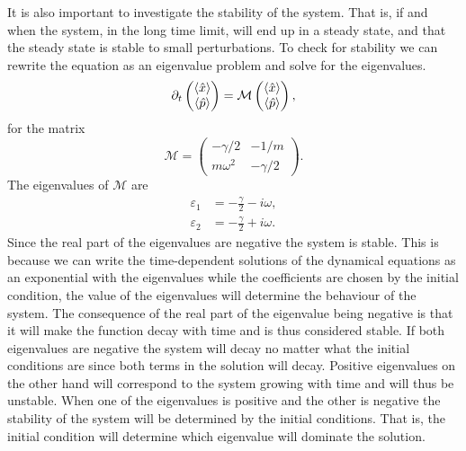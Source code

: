 It is also important to investigate the stability of the system. That is, if and when the system, in the long time limit, will end up in a steady state, and that the steady state is stable to small perturbations. To check for stability we can rewrite the equation as an eigenvalue problem and solve for the eigenvalues.
\begin{equation}
    \partial_t 
    \begin{pmatrix}
        \expval{\hat{x}}\\
        \expval{\hat{p}}    
    \end{pmatrix}
    = \mathcal{M}
    \begin{pmatrix}
        \expval{\hat{x}}\\
        \expval{\hat{p}} 
    \end{pmatrix},
\end{equation}
for the matrix
\begin{equation}
    \mathcal{M} = \begin{pmatrix}
        -\gamma/2 & -1/m \\
        m\omega^2 & -\gamma/2
    \end{pmatrix}.
\end{equation}
The eigenvalues of $\mathcal{M}$ are 
\begin{align}
    \varepsilon_1 &= -\frac{\gamma}{2} - i\omega,\\
    \varepsilon_2 &= -\frac{\gamma}{2} + i\omega.
\end{align}
Since the real part of the eigenvalues are negative the system is stable. This is because we can write the time-dependent solutions of the dynamical equations as an exponential with the eigenvalues while the coefficients are chosen by the initial condition, the value of the eigenvalues will determine the behaviour of the system. The consequence of the real part of the eigenvalue being negative is that it will make the function decay with time and is thus considered stable. If both eigenvalues are negative the system will decay no matter what the initial conditions are since both terms in the solution will decay. Positive eigenvalues on the other hand will correspond to the system growing with time and will thus be unstable. When one of the eigenvalues is positive and the other is negative the stability of the system will be determined by the initial conditions. That is, the initial condition will determine which eigenvalue will dominate the solution.

